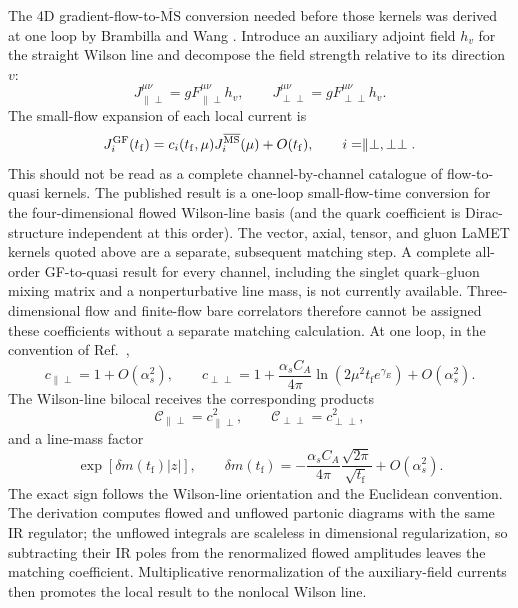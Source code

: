 \documentclass[11pt]{article}
\numberwithin{equation}{section}
\newcommand{\MSbar}{\overline{\mathrm{MS}}}
\newcommand{\tf}{t_{\mathrm f}}
\begin{document}
The 4D gradient-flow-to-$\MSbar$ conversion needed before those kernels was
derived at one loop by Brambilla and Wang \cite{BrambillaWang2024}.  Introduce
an auxiliary adjoint field $h_v$ for the straight Wilson line and decompose
the field strength relative to its direction $v$:
\begin{equation}
 J_{\parallel\perp}^{\mu\nu}=gF_{\parallel\perp}^{\mu\nu}h_v,
 \qquad J_{\perp\perp}^{\mu\nu}=gF_{\perp\perp}^{\mu\nu}h_v .
\end{equation}
The small-flow expansion of each local current is
\begin{equation}
J_i^{\rm GF}(\tf)=c_i(\tf,\mu)J_i^{\MSbar}(\mu)+O(\tf),
 \qquad i=\parallel\perp,\perp\perp .
\end{equation}
This should not be read as a complete channel-by-channel catalogue of
flow-to-quasi kernels.  The published result is a one-loop small-flow-time
conversion for the four-dimensional flowed Wilson-line basis (and the quark
coefficient is Dirac-structure independent at this order).  The vector,
axial, tensor, and gluon LaMET kernels quoted above are a separate, subsequent
matching step.  A complete all-order GF-to-quasi result for every channel,
including the singlet quark--gluon mixing matrix and a nonperturbative line
mass, is not currently available.  Three-dimensional flow and finite-flow
bare correlators therefore cannot be assigned these coefficients without a
separate matching calculation.
At one loop, in the convention of Ref.~\cite{BrambillaWang2024},
\begin{equation}
 c_{\parallel\perp}=1+O(\alpha_s^2),\qquad
 c_{\perp\perp}=1+\frac{\alpha_s C_A}{4\pi}
 \ln(2\mu^2\tf e^{\gamma_E})+O(\alpha_s^2).
\end{equation}
The Wilson-line bilocal receives the corresponding products
\begin{equation}
 \mathcal C_{\parallel\perp}=c_{\parallel\perp}^{2},\qquad
 \mathcal C_{\perp\perp}=c_{\perp\perp}^{2},
\end{equation}
and a line-mass factor
\begin{equation}
 \exp[\delta m(\tf)|z|],\qquad
 \delta m(\tf)=-\frac{\alpha_s C_A}{4\pi}
 \frac{\sqrt{2\pi}}{\sqrt{\tf}}+O(\alpha_s^2).
\end{equation}
The exact sign follows the Wilson-line orientation and the Euclidean
convention.  The derivation computes flowed and unflowed partonic diagrams
with the same IR regulator; the unflowed integrals are scaleless in dimensional
regularization, so subtracting their IR poles from the renormalized flowed
amplitudes leaves the matching coefficient.  Multiplicative renormalization
of the auxiliary-field currents then promotes the local result to the
nonlocal Wilson line.
\end{document}
